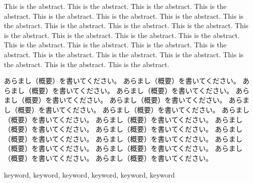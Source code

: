 
\begin{eabstract}
  This is the abstract.
  This is the abstract.
  This is the abstract.
  This is the abstract.
  This is the abstract.
  This is the abstract.
  This is the abstract.
  This is the abstract.
  This is the abstract.
  This is the abstract.
  This is the abstract.
  This is the abstract.
  This is the abstract.
  This is the abstract.
  This is the abstract.
  This is the abstract.
  This is the abstract.
  This is the abstract.
  This is the abstract.
  This is the abstract.
  This is the abstract.
  This is the abstract.
  This is the abstract.
  This is the abstract.
  This is the abstract.
  \end{eabstract}

  \begin{jabstract}
  あらまし（概要）を書いてください。
  あらまし（概要）を書いてください。
  あらまし（概要）を書いてください。
  あらまし（概要）を書いてください。
  あらまし（概要）を書いてください。
  あらまし（概要）を書いてください。
  あらまし（概要）を書いてください。
  あらまし（概要）を書いてください。
  あらまし（概要）を書いてください。
  あらまし（概要）を書いてください。
  あらまし（概要）を書いてください。
  あらまし（概要）を書いてください。
  あらまし（概要）を書いてください。
  あらまし（概要）を書いてください。
  あらまし（概要）を書いてください。
  あらまし（概要）を書いてください。
  あらまし（概要）を書いてください。
  あらまし（概要）を書いてください。
  \end{jabstract}


  \begin{keyword}
  keyword, keyword, keyword, keyword, keyword, keyword
  \end{keyword}

